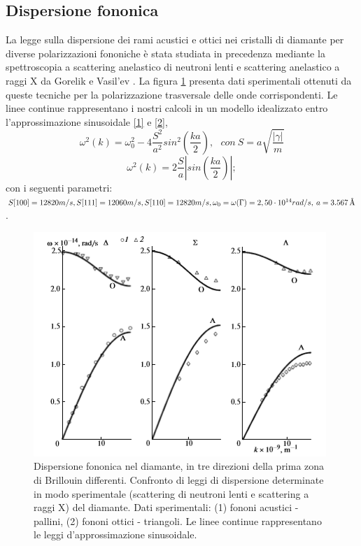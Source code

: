 \documentclass[a4paper,titlepage]{book}
\begin{document}
\subsection{Dispersione fononica}
La legge sulla dispersione dei rami acustici e ottici nei cristalli di diamante per diverse polarizzazioni fononiche è stata studiata in precedenza mediante la spettroscopia a scattering anelastico di neutroni lenti e scattering anelastico a raggi X da Gorelik e Vasil'ev \cite{dimondi}. La figura \ref{phod} presenta dati sperimentali ottenuti da queste tecniche per la polarizzazione trasversale delle onde corrispondenti. Le linee continue rappresentano i nostri calcoli in un modello idealizzato entro l'approssimazione sinusoidale \ref{1} e \ref{2},
\begin{equation} \label{1}
\omega^2(k)=\omega_0^2-4 \frac{S^2}{a^2}sin^2(\frac{ka}{2}),  \: \: \: con \: S=a\sqrt{\frac{\left|\gamma\right|}{m}}
\end{equation}
\begin{equation}\label{2}
\omega^2(k)=2 \frac{S}{a}\left|sin(\frac{ka}{2})\right| ; 
\end{equation}
 con i seguenti parametri: \\
$S[100] = 12820 m/s,\\ S[111]=12060 m/s,\\ S[110]=12820 m/s,\\ \omega_0=\omega(\Gamma) =2,50 \cdot 10^{14} rad/s,\\ \: a=\SI{3,567}{\angstrom}$.

 \begin{figure}[h!] 
	\centering
	\includegraphics[width=0.7\columnwidth]{phodiamond.png}
	\caption{ 	\label{phod}
		Dispersione fononica nel diamante, in tre direzioni della prima zona di Brillouin differenti. Confronto di leggi di dispersione determinate in modo sperimentale (scattering di neutroni lenti e scattering a raggi X) del diamante. Dati sperimentali: (1) fononi acustici - pallini, (2) fononi ottici - triangoli. Le linee continue rappresentano le leggi d'approssimazione sinusoidale.
	}
\end{figure}
\end{document}
